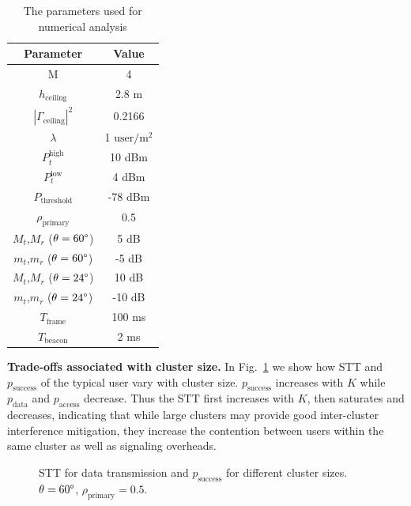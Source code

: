 \documentclass[10pt, conference, letterpaper]{IEEEtran}
\begin{document}
\begin{table}
	\centering
	\caption{The parameters used for numerical analysis}
	\begin{tabular}{cc}
		\hline
		Parameter & Value \\
		\hline
		M & 4 \\
		$h_{\mathrm{ceiling}}$ & 2.8 m \\
		$|\Gamma_{\mathrm{ceiling}}|^2$ & 0.2166 \\
		$\lambda$ & 1 $\mathrm{user/m^2}$ \\
		$P_t^{\mathrm{high}}$ & 10 dBm \\
		$P_t^{\mathrm{low}}$ & 4 dBm \\
		$P_{\mathrm{threshold}}$ & -78 dBm \\
		$\rho_{\mathrm{primary}}$ & 0.5 \\
		$M_t$,$M_r$ ($\theta = 60\degree$) & 5 dB \\
		$m_t$,$m_r$ ($\theta = 60\degree$) & -5 dB \\
		$M_t$,$M_r$ ($\theta = 24\degree$) & 10 dB \\
		$m_t$,$m_r$ ($\theta = 24\degree$) & -10 dB \\		
		$T_{\mathrm{frame}}$ & 100 ms \\
		$T_{\mathrm{beacon}}$ & 2 ms \\
		\hline
	\end{tabular}
	\label{tab:clusteranalysis:parameter}	
\end{table}

\textbf{Trade-offs associated with cluster size.} In Fig.~\ref{fig:clusteranalysis:basic} we show how STT and $p_{\mathrm{success}}$ of the typical user vary with cluster size.  
$p_{\mathrm{success}}$ increases with $K$ while $p_{\mathrm{data}}$ and $p_{\mathrm{access}}$ decrease. 
Thus the STT first increases with $K$, then saturates and decreases, indicating that while large clusters may provide good inter-cluster interference mitigation, they increase the contention between users within the same cluster as well as signaling overheads. 

\begin{figure}[htp]
	\centering
	 \hfill
	
	\caption[]{STT for data transmission  and $p_{\mathrm{success}}$  for different cluster sizes. $\theta=60\degree$, $\rho_{\mathrm{primary}} = 0.5$. }
	\label{fig:clusteranalysis:basic}
\end{figure}
\end{document}
